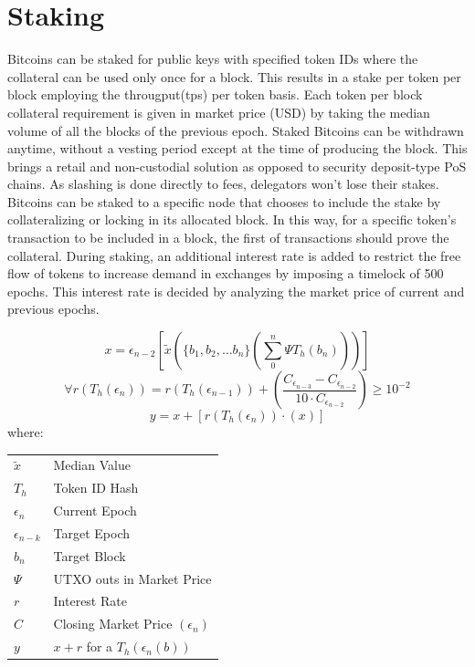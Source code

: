 \documentclass[a4paper,10pt]{article}
\makeatletter
\newenvironment{conditions}
  {\par\vspace{\abovedisplayskip}\noindent\begin{tabular}{>{$}l<{$} @{${}={}$} l}}
  {\end{tabular}\par\vspace{\belowdisplayskip}}
\makeatother
\begin{document}
\section{Staking}
Bitcoins can be staked for public keys with specified token IDs where the collateral can be used only once for a block. This results in a stake per token per block employing the througput(tps) per token basis. Each token per block collateral requirement is given in market price (USD) by taking the median volume of all the blocks of the previous epoch. Staked Bitcoins can be withdrawn anytime, without a vesting period except at the time of producing the block. This brings a retail and non-custodial solution as opposed to security deposit-type PoS chains. As slashing is done directly to fees, delegators won't lose their stakes. Bitcoins can be staked to a specific node that chooses to include the stake by collateralizing or locking in its allocated block. In this way, for a specific token's transaction to be included in a block, the first of transactions should prove the collateral. During staking, an additional interest rate is added to restrict the free flow of tokens to increase demand in exchanges by imposing a timelock of 500 epochs. This interest rate is decided by analyzing the market price of current and previous epochs.

\begin{equation}
x=\epsilon_{n-2}[\widetilde{x}( \{b_1, b_2, \dots b_n\} (\sum_0^n \Psi T_h(b_n)))]
\end{equation}
\begin{equation}
\forall r (T_h(\epsilon_n)) =  r(T_h(\epsilon_{n-1}))  +  (\frac{C_{\epsilon_{n-3}} - C_{\epsilon_{n-2}}}{10  \cdot  C_{\epsilon_{n-2}}}) \geq 10^{-2}
\end{equation}
\begin{equation}
y=x+ [r (T_h(\epsilon_n)) \cdot (x)]
\end{equation}
where:
\begin{conditions}
\widetilde{x} & Median Value\\
T_h & Token ID Hash\\
\epsilon_n & Current Epoch\\
\epsilon_{n-k} & Target Epoch\\
b_n & Target Block\\
\Psi & UTXO outs in Market Price\\
r & Interest Rate\\
C & Closing Market Price $(\epsilon_n)$\\
y & $x+r$ for a $T_h(\epsilon_{n}(b))$
\end{conditions}
\end{document}
